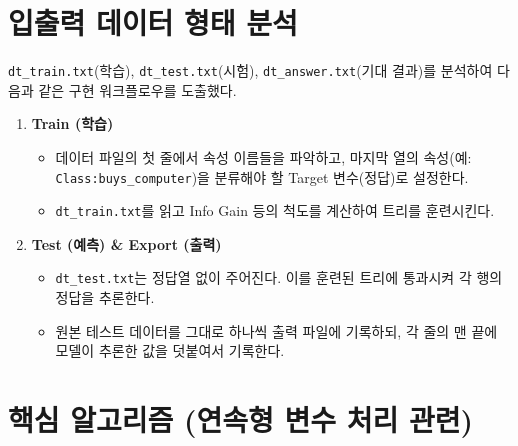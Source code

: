 \documentclass[12pt, a4paper]{article}
\begin{document}
\section{입출력 데이터 형태 분석}

\texttt{dt\_train.txt}(학습), \texttt{dt\_test.txt}(시험), \texttt{dt\_answer.txt}(기대 결과)를 분석하여 다음과 같은 구현 워크플로우를 도출했다.

\begin{enumerate}
    \item \textbf{Train (학습)}
    \begin{itemize}
        \item 데이터 파일의 첫 줄에서 속성 이름들을 파악하고, 마지막 열의 속성(예: \texttt{Class:buys\_computer})을 분류해야 할 Target 변수(정답)로 설정한다.
        \item \texttt{dt\_train.txt}를 읽고 Info Gain 등의 척도를 계산하여 트리를 훈련시킨다.
    \end{itemize}
    \item \textbf{Test (예측) \& Export (출력)}
    \begin{itemize}
        \item \texttt{dt\_test.txt}는 정답열 없이 주어진다. 이를 훈련된 트리에 통과시켜 각 행의 정답을 추론한다.
        \item 원본 테스트 데이터를 그대로 하나씩 출력 파일에 기록하되, 각 줄의 맨 끝에 모델이 추론한 값을 덧붙여서 기록한다.
    \end{itemize}
\end{enumerate}


\section{핵심 알고리즘 (연속형 변수 처리 관련)}
\end{document}
